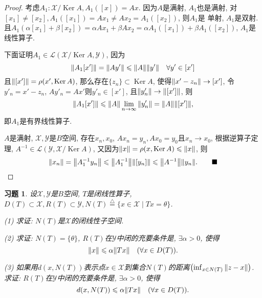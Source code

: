 \documentclass[a4paper,oneside,12pt]{ctexart}
\theoremstyle{plain}
\newtheorem{exercise}{习题}
\theoremstyle{nonumberplain}
\theoremstyle{nonumberplain}
\newtheorem{proof}{证明}
\newcommand{\sX}{\mathscr{X}}
\newcommand{\sY}{\mathscr{Y}}
\newcommand{\DEF}{\overset{\triangle}{=}}
\newcommand{\sL}{\mathscr{L}}
\DeclareMathOperator{\Ker}{Ker}
\begin{document}
    \begin{proof}
        考虑$A_1:\sX/\Ker A,A_1([x])=Ax$. 因为$A$是满射, $A_1$也是满射, 对$[x_1]\neq [x_2],A_1([x_1])=Ax_1\neq Ax_2=A_1([x_2])$, 则$A_1$是
        单射, $A_1$是双射. 且$A_1(\alpha[x_1]+\beta[x_2])=\alpha Ax_1+\beta Ax_2=\alpha A_1([x_1])+\beta A_1([x_2])$, $A_1$是线性算子. 
        
        下面证明$A_1\in\sL(\sX/\Ker A,\sY)$, 因为 
        \begin{equation*}
            \norm{A_1[x']}=\norm{Ay'}\leqslant \norm{A}\norm{y'}\quad\forall y'\in[x']
        \end{equation*}
        且$\norm{[x']}=\rho(x',\Ker A)$, 那么存在$\{z_n\}\subset \Ker A$, 使得$\norm{x'-z_n}\to [x']$, 令$y'_n=x'-z_n$, $Ay'_n=Ax'$则$y'_n\in[x']$, 且$\norm{y'_n}\to\norm{[x']}$, 
        则
        \begin{equation*}
            \norm{A_1[x']}\leqslant \norm{A}\lim_{n\to\infty}\norm{y'_n}=\norm{A}\norm{[x']},
        \end{equation*}
        即$A_1$是有界线性算子. 
        
        $A$是满射, $\sX,\sY$是$B$空间, 存在$x_n,x_0$, $Ax_n=y_n,Ax_0=y_0$且$x_n\to x_0$, 根据逆算子定理, $A^{-1}\in\sL(\sY,\sX/\Ker A)$, 
        又因为$\norm{x}=\rho(x,\Ker A)\leqslant \norm{x}$, 则
        \begin{equation*}
            \norm{x_n}=\norm{A_1^{-1}y_n}\leqslant \norm{A_1^{-1}}\norm{[y_n]}\leqslant \norm{A^{-1}}\norm{y_n}.\qquad \blacksquare
        \end{equation*}
    \end{proof}

    \begin{exercise}
        \label{ex:2.3.12}
        设$\sX,\sY$是$B$空间, $T$是闭线性算子, $D(T)\subset \sX,R(T)\subset \sY,N(T)\DEF\{x\in\sX\mid Tx=\theta\}$.

        (1) 求证: $N(T)$是$\sX$的闭线性子空间.

        (2) 求证: $N(T)=\{\theta\}$, $R(T)$在$\sY$中闭的充要条件是, $\exists \alpha>0$, 使得 
        \begin{equation*}
            \norm{x}\leqslant \alpha\norm{Tx}\quad(\forall x\in D(T)).
        \end{equation*}

        (3) 如果用$d(x,N(T))$表示点$x\in\sX$到集合$N(T)$的距离$\left(\inf_{x\in N(T)}\norm{z-x}\right)$. 求证: $R(T)$在$\sY$中闭的充要条件是, 
        $\exists\alpha>0$, 使得\begin{equation*}
            d(x,N(T))\leqslant \alpha\norm{Tx}\quad (\forall x\in D(T)).
        \end{equation*}
    \end{exercise}
\end{document}
